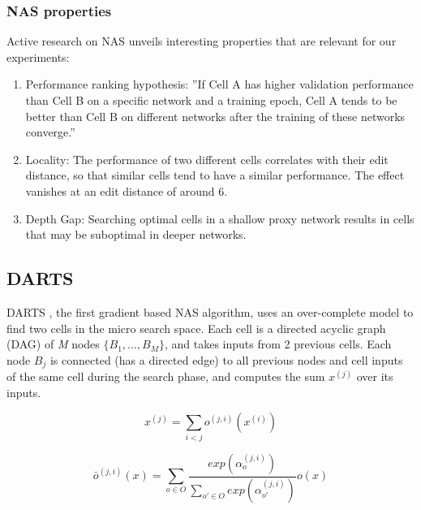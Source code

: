 \documentclass[conference]{IEEEtran}
\begin{document}
\subsubsection*{NAS properties}
\label{sss_rel_properties}


Active research on NAS unveils interesting properties that are relevant for our experiments:
\begin{enumerate}
	\item {
		Performance ranking hypothesis:
		''If Cell A has higher validation performance than Cell B on a specific network and a training epoch, Cell A tends to be better than Cell B on different networks after the training of these networks converge.'' \cite{nas_asap}	
	}
	\item {
		Locality:
		The performance of two different cells correlates with their edit distance, so that similar cells tend to have a similar performance. The effect vanishes at an edit distance of around 6. \cite{nas_bench}
	}
	\item {
		Depth Gap:
		Searching optimal cells in a shallow proxy network results in cells that may be suboptimal in deeper networks. \cite{nas_pdarts}
	}
\end{enumerate}





\subsection{DARTS}
\label{ss_rel_darts}



DARTS \cite{nas_darts}, the first gradient based NAS algorithm, uses an over-complete model to find two cells in the micro search space.
Each cell is a directed acyclic graph (DAG) of \textit{M} nodes $\{B_1, ..., B_M\}$, and takes inputs from 2 previous cells.
Each node $B_j$ is connected (has a directed edge) to all previous nodes and cell inputs of the same cell during the search phase, and computes the sum $x^{(j)}$ over its inputs.

\vspace*{-2pt}
$$x^{(j)} = \sum_{i < j} o^{(j, i)}(x^{(i)})$$

\vspace*{-4pt}
$$
\bar{o}^{(j, i)}(x) = \sum_{o \in O}
\frac{exp(\alpha_o^{(j, i)})}{\sum_{o' \in O} exp(\alpha_{o'}^{(j, i)})}
o(x)$$
\end{document}
